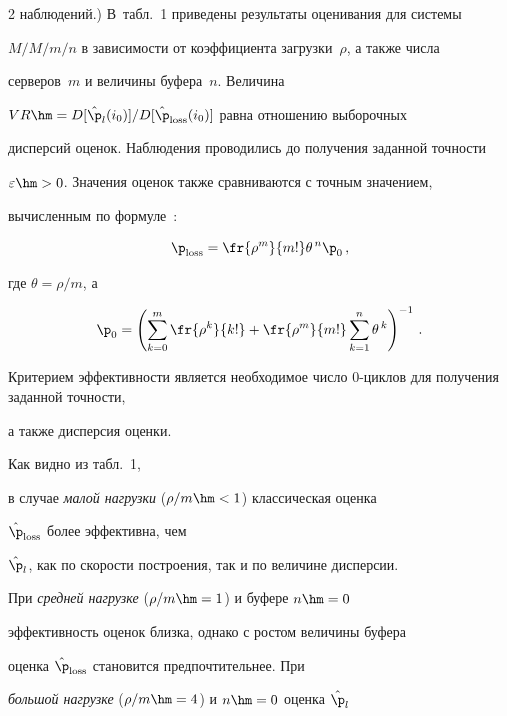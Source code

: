 \begin{multicols}{2}
{наблюдений}.) В~табл.~1 приведены результаты оценивания  для  сис\-те\-мы


$M/M/m/n$  в зависимости от коэффициента загрузки~$\rho$, а также чис\-ла


серверов~$m$ и величины буфера~$n$. Величина


$VR\hm=D[\hat{\p}_l(i_0)]/D[\hat{\p}_{\mathrm{loss}}(i_0)]$ равна отношению выборочных


дисперсий оценок. Наблюдения проводились до получения заданной точности


$\varepsilon\hm>0$. Значения оценок также сравниваются  с точным значением,


вычисленным по формуле~\cite{Gnedenko}:


\begin{equation*} 




 \p_{\mathrm{loss}}=\fr{\rho^{m}}{m!}\theta ^{\,n}\p_0\,,


\end{equation*} 


где $\theta=\rho/m$, а 


\begin{equation*} 




\p_0=\left(\sum\limits_{k=0}^m\fr{\rho^k}{k!}+\fr{\rho^m}{m!}\sum\limits_{k=1}^n


\theta^{\,k}\right)^{-1}\,. 


\end{equation*} 


Критерием эффективности является необходимое число 0-цик\-лов для получения заданной точности,


а также  дисперсия  оценки.


Как видно из табл.~1,


в случае \textit{малой нагрузки} ($\rho/m\hm<1$) классическая оценка


$\hat{\p}_{\mathrm{loss}}$ более  эффективна, чем


 $\hat{\p}_l$,  как по скорости построения, так и по величине  дисперсии.


При \textit{средней нагрузке} ($\rho/m\hm=1$) и  буфере $n\hm=0$


эффективность оценок близка, однако с ростом величины   буфера


оценка $\hat{\p}_{\mathrm{loss}}$ становится предпочтительнее. При


\textit{большой нагрузке} ($\rho/m\hm=4$) и $n\hm=0$ оценка $\hat{\p}_l$



\end{multicols}
